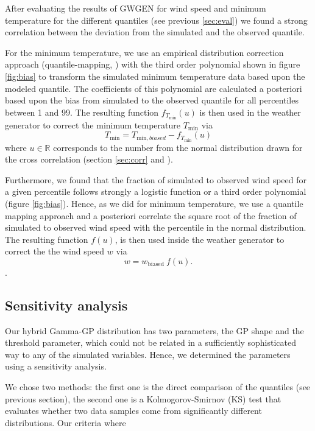 \begin{refsection}
After evaluating the results of GWGEN for wind speed and minimum temperature for the different quantiles (see previous \autoref{sec:eval}) we found a strong correlation between the deviation from the simulated and the observed quantile.

For the minimum temperature, we use an empirical distribution correction approach (quantile-mapping, \cite{LafonDadsonBuysEtAl2012}) with the third order polynomial shown in figure \ref{fig:bias} to transform the simulated minimum temperature data based upon the modeled quantile. The coefficients of this polynomial are calculated a posteriori based upon the bias from simulated to the observed quantile for all percentiles between 1 and 99. The resulting function $f_{T_\mathrm{min}}(u)$ is then used in the weather generator to correct the minimum temperature $T_\mathrm{min}$ via
\begin{equation}
T_\mathrm{min} = T_{\mathrm{min}, biased} - f_{T_\mathrm{min}}(u) \label{eq:bias-tmin}
\end{equation}
where $u\in\mathbb R$ corresponds to the number from the normal distribution drawn for the cross correlation (section \ref{sec:corr} and \cite{Richardson1981}).

Furthermore, we found that the fraction of simulated to observed wind speed for a given percentile follows strongly a logistic function or a third order polynomial (figure \ref{fig:bias}). Hence, as we did for minimum temperature, we use a quantile mapping approach and a posteriori correlate the square root of the fraction of simulated to observed wind speed with the percentile in the normal distribution. The resulting function $f(u)$, is then used inside the weather generator to correct the the wind speed $w$ via
\begin{equation}
w = w_\mathrm{biased} \ f(u). \label{eq:bias-wind}
\end{equation}.


\subsection{Sensitivity analysis}
Our hybrid Gamma-GP distribution has two parameters, the GP shape and the threshold parameter, which could not be related in a sufficiently sophisticated way to any of the simulated variables. Hence, we determined the parameters using a sensitivity analysis.

We chose two methods: the first one is the direct comparison of the quantiles (see previous section), the second one is a Kolmogorov-Smirnov (KS) test that evaluates whether two data samples come from significantly different distributions. Our criteria where


\end{refsection}
